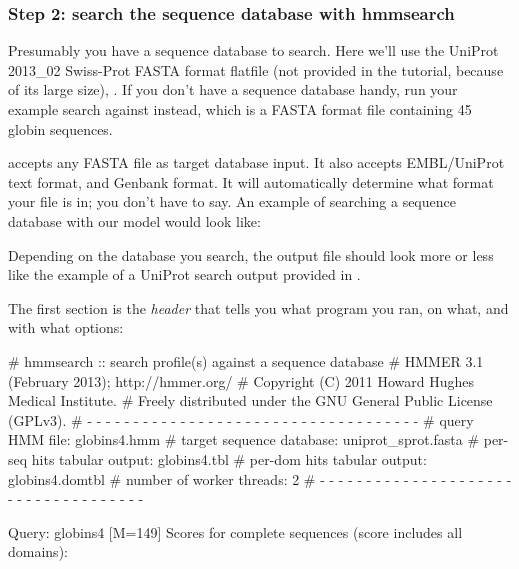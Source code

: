 

\subsubsection{Step 2: search the sequence database with hmmsearch}

Presumably you have a sequence database to search. Here we'll use the
UniProt 2013\_02 Swiss-Prot FASTA format flatfile (not provided in the
tutorial, because of its large size), .  If
you don't have a sequence database handy, run your example search
against  instead, which is a FASTA format
file containing 45 globin sequences.

 accepts any FASTA file as target database input. It also
accepts EMBL/UniProt text format, and Genbank format. It will automatically
determine what format your file is in; you don't have to say. An example of
searching a sequence database with our  model would look
like:


Depending on the database you search, the output file
 should look more or less like the example of a
UniProt search output provided in .

The first section is the \emph{header} that tells you what program you
ran, on what, and with what options:

\begin{sreoutput}
# hmmsearch :: search profile(s) against a sequence database
# HMMER 3.1 (February 2013); http://hmmer.org/
# Copyright (C) 2011 Howard Hughes Medical Institute.
# Freely distributed under the GNU General Public License (GPLv3).
# - - - - - - - - - - - - - - - - - - - - - - - - - - - - - - - - - - - -
# query HMM file:                  globins4.hmm
# target sequence database:        uniprot\_sprot.fasta
# per-seq hits tabular output:     globins4.tbl
# per-dom hits tabular output:     globins4.domtbl
# number of worker threads:        2
# - - - - - - - - - - - - - - - - - - - - - - - - - - - - - - - - - - - -

Query:       globins4  [M=149]
Scores for complete sequences (score includes all domains):
\end{sreoutput}

